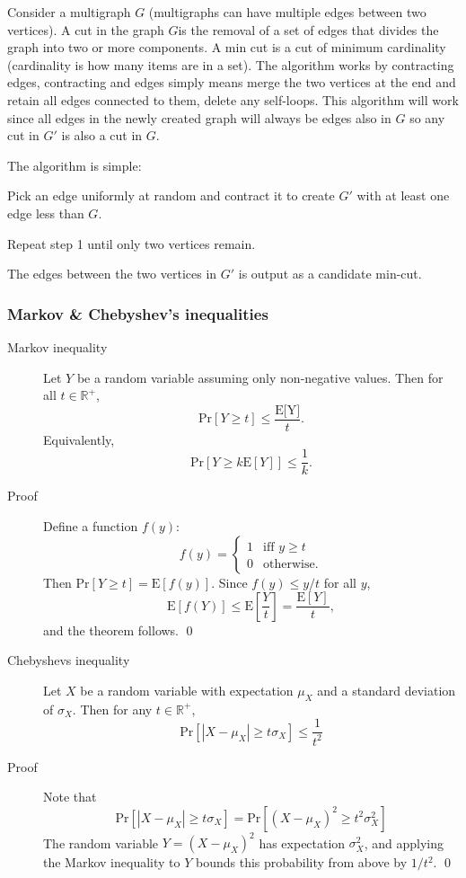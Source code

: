 Consider a multigraph $G$ (multigraphs can have multiple edges between two vertices). A cut in the graph $G$is the removal of a set of edges that divides the graph into
two or more components. A min cut is a cut of minimum cardinality (cardinality is how many items are in a set).
The algorithm works by contracting edges, contracting and edges simply means merge the two vertices at the end and retain all edges connected to them, delete any self-loops.
This algorithm will work since all edges in the newly created graph will always be edges also in $G$ so any cut in $G'$ is also a cut in $G$.

The algorithm is simple:
\begin{enumerate*}
  \item Pick an edge uniformly at random and contract it to create $G'$ with at least one edge less than $G$.
  \item Repeat step 1 until only two vertices remain.
  \item The edges between the two vertices in $G'$ is output as a candidate min-cut.
\end{enumerate*}




\subsubsection{Markov \& Chebyshev's inequalities}
\begin{description}
\item[Markov inequality] Let $Y$ be a random variable assuming only non-negative
  values. Then for all $t \in \mathbb{R}^+$,
  \[
    \text{Pr}[Y \geq t] \leq \frac{\text{E[Y]}}{t}.
  \]
  Equivalently,
  \[
    \text{Pr}[Y \geq k\text{E}[Y]] \leq \frac{1}{k}.
  \]
\item[Proof] Define a function $f(y)$:
  \[
   f(y) = \begin{cases}
     1 & \text{iff } y \geq t\\
     0 & \text{otherwise.}
   \end{cases}
  \]
  Then $\text{Pr}[Y \geq t] = \text{E}[f(y)]$. Since $f(y) \leq y/t$ for all $y$,
  \[
    \text{E}[f(Y)] \leq \text{E}\left [\frac{Y}{t} \right ] = \frac{\text{E}[Y]}{t},
  \]
  and the theorem follows. \qed
\end{description}

\begin{description}
\item[Chebyshevs inequality] Let $X$ be a random variable with expectation
  $\mu_X$ and a standard deviation of $\sigma_X$. Then for any $t \in
  \mathbb{R}^+$,
  \[
    \text{Pr}[|X - \mu_X| \geq t\sigma_X] \leq \frac{1}{t^2}
  \]
\item[Proof] Note that
  \[
    \text{Pr}[|X - \mu_X| \geq t\sigma_X] = \text{Pr}[(X - \mu_X)^2 \geq
    t^2\sigma_X^2]
  \]
  The random variable $Y = (X - \mu_X)^2$ has expectation $\sigma_X^2$, and
  applying the Markov inequality to $Y$ bounds this probability from above by
  $1/t^2$. \qed
\end{description}

